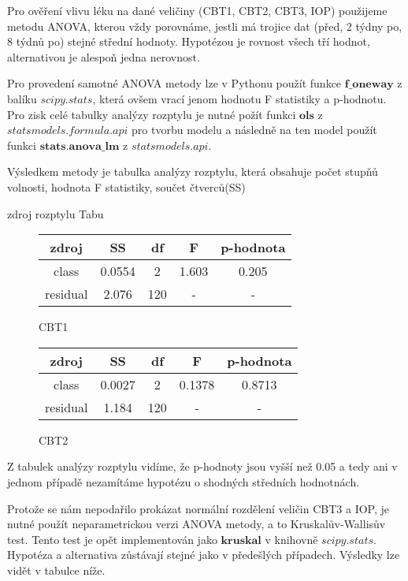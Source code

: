 \documentclass{article}
\begin{document}
Pro ověření vlivu léku na dané veličiny (CBT1, CBT2, CBT3, IOP) použijeme metodu ANOVA, kterou vždy porovnáme,
jestli má trojice dat (před, 2 týdny po, 8 týdnů po) stejné střední hodnoty.
Hypotézou je rovnost všech tří hodnot, alternativou je alespoň jedna nerovnost.

Pro provedení samotné ANOVA metody lze v Pythonu použít funkce $\mathbf{f\_oneway}$ z balíku $scipy.stats$, která ovšem vrací jenom
hodnotu F statistiky a p-hodnotu.
Pro zisk celé tabulky analýzy rozptylu je nutné požít funkci $\mathbf{ols}$ z $statsmodels.formula.api$ pro tvorbu modelu
a následně na ten model použít funkci $\mathbf{stats.anova\_lm}$ z $statsmodels.api$.

Výsledkem metody je tabulka analýzy rozptylu, která obsahuje
počet stupňů volnosti, hodnota F statistiky, součet čtverců(SS)

zdroj rozptylu
Tabu

\begin{figure}[H]
  \centering
    \begin{tabular}{|ccccc|}
      \hline
      zdroj & SS & df & F & p-hodnota \\
      \hline
      class & 0.0554 & 2 & 1.603 & 0.205 \\
      residual & 2.076 & 120 & - & - \\
      \hline
    \end{tabular}
    \caption{CBT1}
    \label{subfig:table1}
\end{figure}
    

\begin{figure}[H]
  \centering
    \begin{tabular}{|ccccc|}
      \hline
      zdroj & SS & df & F & p-hodnota \\
      \hline
      class & 0.0027 & 2 & 0.1378 & 0.8713 \\
      residual & 1.184 & 120 & - & - \\
      \hline
    \end{tabular}
    \caption{CBT2}
    \label{subfig:table2}
\end{figure}

Z tabulek analýzy rozptylu vidíme, že p-hodnoty jsou vyšší než 0.05 a tedy ani v jednom případě nezamítáme hypotézu o shodných středních hodnotnách.

Protože se nám nepodařilo prokázat normální rozdělení veličin CBT3 a IOP, je nutné použít neparametrickou verzi ANOVA metody, a to Kruskalův-Wallisův test. 
Tento test je opět implementován jako $\mathbf{kruskal}$ v knihovně $scipy.stats$.
Hypotéza a alternativa zůstávají stejné jako v předešlých případech.
Výsledky lze vidět v tabulce níže.
\end{document}
